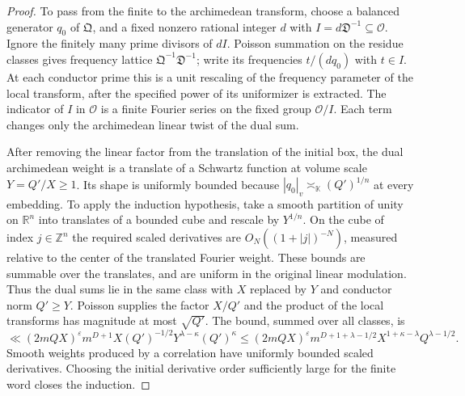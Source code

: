 \documentclass[11pt,letterpaper]{article}
\theoremstyle{definition}
\numberwithin{equation}{section}
\begin{document}
\begin{proof}
To pass from the finite to the archimedean transform, choose a
balanced generator $q_0$ of $\mathfrak Q$, and a fixed nonzero
rational integer $d$ with $I=d\mathfrak D^{-1}\subseteq\mathcal O$.
Ignore the finitely many prime divisors of $dI$. Poisson summation
on the residue classes gives frequency lattice
$\mathfrak Q^{-1}\mathfrak D^{-1}$; write its frequencies
$t/(d q_0)$ with $t\in I$. At each conductor prime this is a unit
rescaling of the frequency parameter of the local transform, after
the specified power of its uniformizer is extracted. The indicator
of $I$ in $\mathcal O$ is a finite Fourier series on the fixed
group $\mathcal O/I$. Each term changes only the archimedean linear
twist of the dual sum.

After removing the linear factor from the translation of the initial
box, the dual archimedean weight is a translate of a Schwartz function
at volume scale $Y=Q'/X\ge1$. Its shape is uniformly bounded because
$|q_0|_v\asymp_{\mathbb K}(Q')^{1/n}$ at every embedding. To apply
the induction hypothesis, take a smooth partition of unity on
$\mathbb R^n$ into translates of a bounded cube and rescale by
$Y^{1/n}$. On the cube of index $j\in\mathbb Z^n$ the required
scaled derivatives are $O_N((1+|j|)^{-N})$, measured relative to
the center of the translated Fourier weight. These bounds are
summable over the translates, and are uniform in the original
linear modulation. Thus the dual sums lie in the same class with
$X$ replaced by $Y$ and conductor norm $Q'\ge Y$. Poisson supplies
the factor $X/Q'$ and the product of the local transforms has
magnitude at most $\sqrt{Q'}$. The bound, summed over all classes, is
\[
 \ll (2mQX)^\varepsilon m^{D+1}
        X(Q')^{-1/2}Y^{\lambda-\kappa}(Q')^\kappa
 \le (2mQX)^\varepsilon
       m^{D+1+\lambda-1/2}X^{1+\kappa-\lambda}Q^{\lambda-1/2}.
\]
Smooth weights produced by a correlation have uniformly bounded
scaled derivatives. Choosing the initial derivative order sufficiently
large for the finite word closes the induction.
\end{proof}
\end{document}
